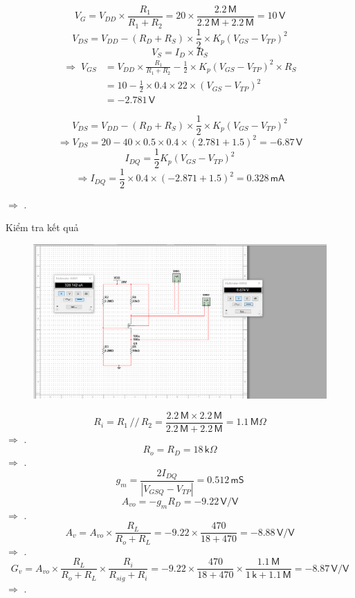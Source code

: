 \[
V_{G}=V_{DD}\times\frac{R_{1}}{R_{1}+R_{2}}=20\times\frac{2.2\,\textsf{M}}{2.2\,\textsf{M}+2.2\,\textsf{M}}=10\,\textsf{V}
\]
\[
V_{DS}=V_{DD}-\left(R_{D}+R_{S}\right)\times\frac{1}{2}\times K_{p}\left(V_{GS}-V_{TP}\right)^{2}
\]
\[
V_{S}=I_{D}\times R_{S}
\]
\[
\begin{aligned}
	\Rightarrow\; V_{GS} &= V_{DD}\times\frac{R_{1}}{R_{1}+R_{2}}
	- \frac{1}{2}\times K_{p}\left(V_{GS}-V_{TP}\right)^{2}\times R_{S} \\[6pt]
	&= 10 - \frac{1}{2}\times0.4\times22\times\left(V_{GS}-V_{TP}\right)^{2} \\[6pt]
	&= -2.781\,\textsf{V}
\end{aligned}
\]

\[
V_{DS}=V_{DD}-\left(R_{D}+R_{S}\right)\times\frac{1}{2}\times K_{p}\left(V_{GS}-V_{TP}\right)^{2}
\]
\[
\Rightarrow V_{DS}=20-40\times0.5\times0.4\times\left(2.781+1.5\right)^{2}=-6.87\,\textsf{V}
\]
\[
I_{DQ}=\frac{1}{2}K_{p}\left(V_{GS}-V_{TP}\right)^{2}
\]
\[
\Rightarrow I_{DQ}=\frac{1}{2}\times0.4\times\left(-2.871+1.5\right)^{2}=0.328\,\textsf{mA}
\]

$\Rightarrow$ .

Kiểm tra kết quả

\begin{figure}[H]
	\centering
	\includegraphics[width=\linewidth]{./my-chapters/my-images/Question1/Câu 1 Hình 2 a - Điểm Q.png}
\end{figure}


\[
R_{i}=R_{1}\,//\,R_{2}=\frac{2.2\,\textsf{M}\times2.2\,\textsf{M}}{2.2\,\textsf{M}+2.2\,\textsf{M}}=1.1\,\textsf{M}\Omega
\]
$\Rightarrow$ .
\[
R_{o}=R_{D}=18\,\textsf{k}\Omega
\]
$\Rightarrow$ .
\[
g_{m}=\frac{2I_{DQ}}{\left|V_{GSQ}-V_{TP}\right|}=0.512\,\textsf{mS}
\]
\[
A_{vo}=-g_{m}R_{D}=-9.22\,\textsf{V/V}
\]
$\Rightarrow$ .
\[
A_{v}=A_{vo}\times\frac{R_{L}}{R_{o}+R_{L}}=-9.22\times\frac{470}{18+470}=-8.88\,\textsf{V/V}
\]
$\Rightarrow$ .
\[
G_{v}=A_{vo}\times\frac{R_{L}}{R_{o}+R_{L}}\times\frac{R_{i}}{R_{sig}+R_{i}}=-9.22\times\frac{470}{18+470}\times\frac{1.1\,\textsf{M}}{1\,\textsf{k}+1.1\,\textsf{M}}=-8.87\,\textsf{V/V}
\]
$\Rightarrow$ .

